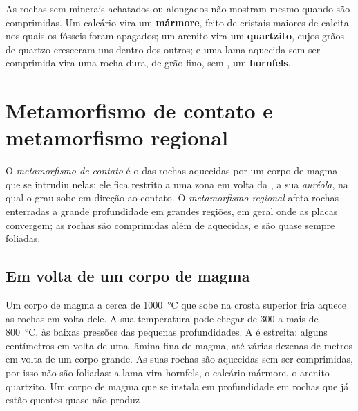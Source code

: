 As rochas sem minerais achatados ou alongados não mostram  mesmo
quando são comprimidas. Um calcário vira um \textbf{mármore}, feito de
cristais maiores de calcita nos quais os fósseis foram apagados; um arenito
vira um \textbf{quartzito}, cujos grãos de quartzo cresceram uns dentro dos
outros; e uma lama aquecida sem ser comprimida vira uma rocha dura, de grão
fino, sem , um \textbf{hornfels}.

\section{Metamorfismo de contato e metamorfismo regional}

\begin{definition}\label{def:g12:metamorphic-rocks:contact-regional}
O \emph{metamorfismo de contato} é o
 das rochas aquecidas por um corpo de magma que se intrudiu
nelas; ele fica restrito a uma zona em volta da , a sua
\emph{auréola}, na qual o grau sobe em direção ao
contato. O \emph{metamorfismo regional} afeta
rochas enterradas a grande profundidade em grandes regiões, em geral onde as
placas convergem; as rochas são comprimidas além de aquecidas, e são quase
sempre foliadas.
\end{definition}

\subsection{Em volta de um corpo de magma}

Um corpo de magma a cerca de \qty{1000}{\celsius} que sobe na crosta
superior fria aquece as rochas em volta dele. A sua temperatura pode chegar
de 300 a mais de \qty{800}{\celsius}, às baixas pressões das pequenas
profundidades. A  é estreita: alguns centímetros em volta de uma
lâmina fina de magma, até várias dezenas de metros em volta de um corpo
grande. As suas rochas são aquecidas sem ser comprimidas, por isso não são
foliadas: a lama vira hornfels, o calcário mármore, o arenito quartzito. Um
corpo de magma que se instala em profundidade em rochas que já estão
quentes quase não produz .

